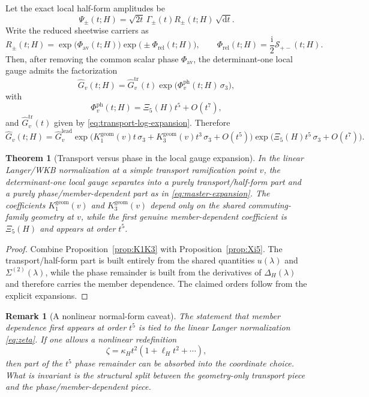 \documentclass[11pt]{article}
\newtheorem{theorem}{Theorem}
\newtheorem{remark}{Remark}
\newcommand{\ii}{\mathrm i}
\newcommand{\dd}{\mathrm d}
\newcommand{\pairgap}{\Delta}
\newcommand{\leadG}{\widehat G_v^{\mathrm{lead}}}
\newcommand{\trG}{\widehat G_v^{\mathrm{tr}}}
\newcommand{\phP}{\Phi_v^{\mathrm{ph}}}
\newcommand{\Kone}{K_1^{\mathrm{geom}}(v)}
\newcommand{\Kthree}{K_3^{\mathrm{geom}}(v)}
\begin{document}
Let the exact local half-form amplitudes be
\[
 \Psi_\pm(t;H)=\sqrt{2t}\,\Gamma_\pm(t)R_\pm(t;H)\,\sqrt{\dd t}.
\]
Write the reduced sheetwise carriers as
\[
 R_\pm(t;H)=\exp\!\bigl(\Phi_{\mathrm{av}}(t;H)\bigr)\exp\!\bigl(\pm \Phi_{\mathrm{rel}}(t;H)\bigr),
\qquad
 \Phi_{\mathrm{rel}}(t;H)=\frac{\ii}{2}\mathcal S_{+-}(t;H).
\]
Then, after removing the common scalar phase $\Phi_{\mathrm{av}}$, the determinant-one local gauge admits the factorization
\begin{equation}
\label{eq:closed-factorization}
 \boxed{
 \widehat G_v(t;H)
 =
 \trG(t)
 \exp\!\bigl(\phP(t;H)\,\sigma_3\bigr),
 }
\end{equation}
with
\begin{equation}
\label{eq:phase-factor}
 \phP(t;H)=\Xi_5(H)t^5+O(t^7),
\end{equation}
and $\trG(t)$ given by \eqref{eq:transport-log-expansion}.  Therefore
\begin{equation}
\label{eq:master-expansion}
 \boxed{
 \widehat G_v(t;H)
 =
 \leadG
 \exp\!\bigl(\Kone t\,\sigma_3 + \Kthree t^3\,\sigma_3 + O(t^5)\bigr)
 \exp\!\bigl(\Xi_5(H)t^5\,\sigma_3 + O(t^7)\bigr).
 }
\end{equation}

\begin{theorem}[Transport versus phase in the local gauge expansion]
\label{thm:main}
In the linear Langer/WKB normalization at a simple transport ramification point $v$, the determinant-one local gauge separates into a purely transport/half-form part and a purely phase/member-dependent part as in \eqref{eq:master-expansion}.  The coefficients $\Kone$ and $\Kthree$ depend only on the shared commuting-family geometry at $v$, while the first genuine member-dependent coefficient is $\Xi_5(H)$ and appears at order $t^5$.
\end{theorem}

\begin{proof}
Combine Proposition~\ref{prop:K1K3} with Proposition~\ref{prop:Xi5}.  The transport/half-form part is built entirely from the shared quantities $u(\lambda)$ and $\Sigma^{(2)}(\lambda)$, while the phase remainder is built from the derivatives of $\pairgap_H(\lambda)$ and therefore carries the member dependence.  The claimed orders follow from the explicit expansions.
\end{proof}

\begin{remark}[A nonlinear normal-form caveat]
The statement that member dependence first appears at order $t^5$ is tied to the \emph{linear} Langer normalization \eqref{eq:zeta}.  If one allows a nonlinear redefinition
\[
\zeta=\kappa_H t^2(1+\ell_H t^2+\cdots),
\]
then part of the $t^5$ phase remainder can be absorbed into the coordinate choice.  What is invariant is the structural split between the geometry-only transport piece and the phase/member-dependent piece.
\end{remark}
\end{document}
